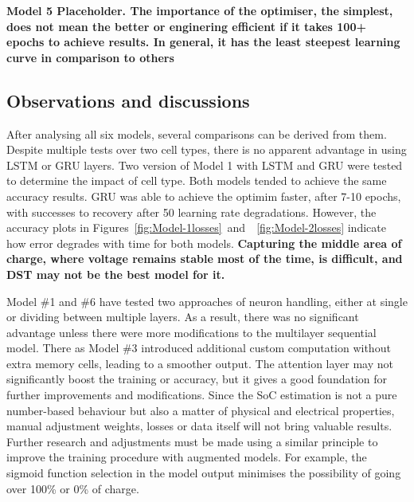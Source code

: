 %
%
\textbf{Model 5 Placeholder. The importance of the optimiser, the simplest, does not mean the better or enginering efficient if it takes 100+ epochs to achieve results. In general, it has the least steepest learning curve in comparison to others} \\

%
%
\subsection{Observations and discussions}
After analysing all six models, several comparisons can be derived from them.
Despite multiple tests over two cell types, there is no apparent advantage in using LSTM or GRU layers.
Two version of Model 1 with LSTM and GRU were tested to determine the impact of cell type.
Both models tended to achieve the same accuracy results.
GRU was able to achieve the optimim faster, after 7-10 epochs, with successes to recovery after 50 learning rate degradations.
However, the accuracy plots in \mbox{Figures~\ref{fig:Model-1losses} and ~\ref{fig:Model-2losses}} indicate how error degrades with time for both models.
\textbf{Capturing the middle area of charge, where voltage remains stable most of the time, is difficult, and DST may not be the best model for it.}

%
%
Model \#1 and \#6 have tested two approaches of neuron handling, either at single or dividing between multiple layers.
As a result, there was no significant advantage unless there were more modifications to the multilayer sequential model.
There as Model \#3 introduced additional custom computation without extra memory cells, leading to a smoother output.
The attention layer may not significantly boost the training or accuracy, but it gives a good foundation for further improvements and modifications.
Since the SoC estimation is not a pure number-based behaviour but also a matter of physical and electrical properties, manual adjustment weights, losses or data itself will not bring valuable results.
Further research and adjustments must be made using a similar principle to improve the training procedure with augmented models. 
For example, the sigmoid function selection in the model output minimises the possibility of going over 100\% or 0\% of charge.

